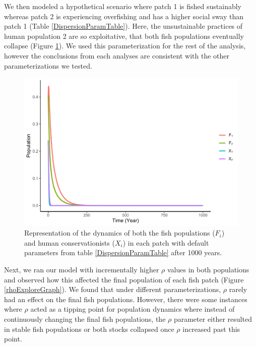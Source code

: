 \documentclass[
]{article}
\begin{document}
We then modeled a hypothetical scenario where patch 1 is fished sustainably whereas patch 2 is experiencing overfishing and has a higher social sway than patch 1 (Table \ref{DispersionParamTable}). Here, the unsustainable practices of human population 2 are so exploitative, that both fish populations eventually collapse (Figure \ref{DispersionScenario}). We used this parameterization for the rest of the analysis, however the conclusions from each analyses are consistent with the other parameterizations we tested.



\begin{figure}
\centering
\includegraphics{Wulfing_Thesis_files/figure-latex/DispersionScenario-1.pdf}
\caption{\label{fig:DispersionScenario}Representation of the dynamics of both the fish populations (\(F_i\)) and human conservationists (\(X_i\)) in each patch with default parameters from table \ref{DispersionParamTable} after 1000 years. \label{DispersionScenario}}
\end{figure}

Next, we ran our model with incrementally higher \(\rho\) values in both populations and observed how this affected the final population of each fish patch (Figure \ref{rhoExploreGraph}). We found that under different parameterizations, \(\rho\) rarely had an effect on the final fish populations. However, there were some instances where \(\rho\) acted as a tipping point for population dynamics where instead of continuously changing the final fish populations, the \(\rho\) parameter either resulted in stable fish populations or both stocks collapsed once \(\rho\) increased past this point.
\end{document}
